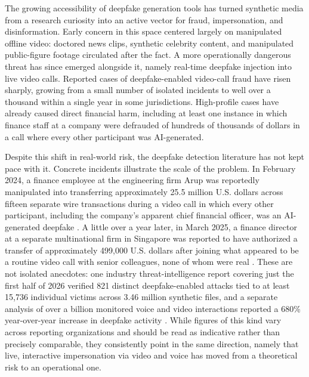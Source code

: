 \documentclass[conference]{IEEEtran}
\begin{document}
The growing accessibility of deepfake generation tools has turned synthetic media from a research curiosity into an active vector for fraud, impersonation, and disinformation. Early concern in this space centered largely on manipulated offline video: doctored news clips, synthetic celebrity content, and manipulated public-figure footage circulated after the fact. A more operationally dangerous threat has since emerged alongside it, namely real-time deepfake injection into live video calls. Reported cases of deepfake-enabled video-call fraud have risen sharply, growing from a small number of isolated incidents to well over a thousand within a single year in some jurisdictions. High-profile cases have already caused direct financial harm, including at least one instance in which finance staff at a company were defrauded of hundreds of thousands of dollars in a call where every other participant was AI-generated.

Despite this shift in real-world risk, the deepfake detection literature has not kept pace with it. Concrete incidents illustrate the scale of the problem. In February 2024, a finance employee at the engineering firm Arup was reportedly manipulated into transferring approximately 25.5 million U.S. dollars across fifteen separate wire transactions during a video call in which every other participant, including the company's apparent chief financial officer, was an AI-generated deepfake \cite{globalstats2026}. A little over a year later, in March 2025, a finance director at a separate multinational firm in Singapore was reported to have authorized a transfer of approximately 499,000 U.S. dollars after joining what appeared to be a routine video call with senior colleagues, none of whom were real \cite{brightside2025}. These are not isolated anecdotes: one industry threat-intelligence report covering just the first half of 2026 verified 821 distinct deepfake-enabled attacks tied to at least 15,736 individual victims across 3.46 million synthetic files, and a separate analysis of over a billion monitored voice and video interactions reported a 680\% year-over-year increase in deepfake activity \cite{deepstrike2026}. While figures of this kind vary across reporting organizations and should be read as indicative rather than precisely comparable, they consistently point in the same direction, namely that live, interactive impersonation via video and voice has moved from a theoretical risk to an operational one.
\end{document}
